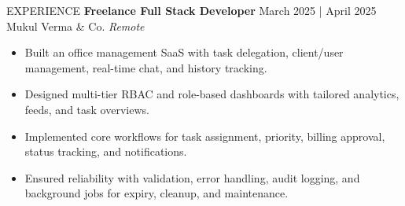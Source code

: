 \documentclass{resume} %
\begin{document}
\begin{rSection}{EXPERIENCE}
\vspace{-0.5em}
\textbf{Freelance Full Stack Developer} \hfill March 2025 | April 2025\\
Mukul Verma \& Co. \hfill \textit{Remote}
 \begin{itemize}
    \itemsep -4pt {} 
     \item Built an office management SaaS with task delegation, client/user management, real-time chat, and history tracking.
     \item Designed multi-tier RBAC and role-based dashboards with tailored analytics, feeds, and task overviews.
     \item Implemented core workflows for task assignment, priority, billing approval, status tracking, and notifications.
     \item Ensured reliability with validation, error handling, audit logging, and background jobs for expiry, cleanup, and maintenance.
 \end{itemize}

\end{rSection}

\end{document}
